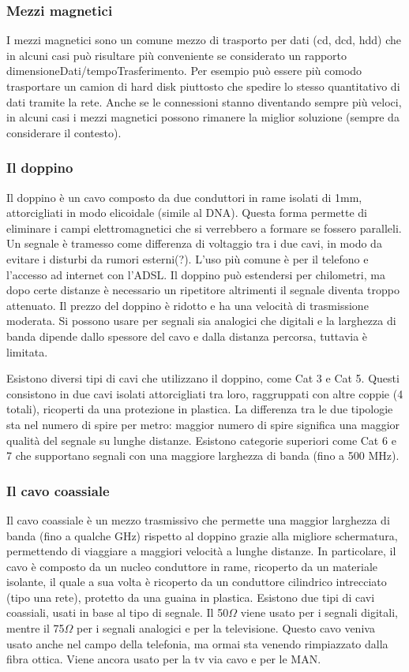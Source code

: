 \subsubsection{Mezzi magnetici}
I mezzi magnetici sono un comune mezzo di trasporto per dati (cd, dcd, hdd) che in alcuni casi può risultare più conveniente se considerato un rapporto dimensioneDati/tempoTrasferimento.
Per esempio può essere più comodo trasportare un camion di hard disk piuttosto che spedire lo stesso quantitativo di dati tramite la rete. 
Anche se le connessioni stanno diventando sempre più veloci, in alcuni casi i mezzi magnetici possono rimanere la miglior soluzione (sempre da considerare il contesto).

\subsubsection{Il doppino}
Il doppino è un cavo composto da due conduttori in rame isolati di 1mm, attorcigliati in modo elicoidale (simile al DNA).
Questa forma permette di eliminare i campi elettromagnetici che si verrebbero a formare se fossero paralleli.
Un segnale è tramesso come differenza di voltaggio tra i due cavi, in modo da evitare i disturbi da rumori esterni(?).
L'uso più comune è per il telefono e l'accesso ad internet con l'ADSL. 
Il doppino può estendersi per chilometri, ma dopo certe distanze è necessario un ripetitore altrimenti il segnale diventa troppo attenuato.
Il prezzo del doppino è ridotto e ha una velocità di trasmissione moderata.
Si possono usare per segnali sia analogici che digitali e la larghezza di banda dipende dallo spessore del cavo e dalla distanza percorsa, tuttavia è limitata.

Esistono diversi tipi di cavi che utilizzano il doppino, come Cat 3 e Cat 5.
Questi consistono in due cavi isolati attorcigliati tra loro, raggruppati con altre coppie (4 totali), ricoperti da una protezione in plastica.
La differenza tra le due tipologie sta nel numero di spire per metro: maggior numero di spire significa una maggior qualità del segnale su lunghe distanze.
Esistono categorie superiori come Cat 6 e 7 che supportano segnali con una maggiore larghezza di banda (fino a 500 MHz).

\subsubsection{Il cavo coassiale}
Il cavo coassiale è un mezzo trasmissivo che permette una maggior larghezza di banda (fino a qualche GHz) rispetto al doppino grazie alla migliore schermatura,
permettendo di viaggiare a maggiori velocità a lunghe distanze.
In particolare, il cavo è composto da un nucleo conduttore in rame, ricoperto da un materiale isolante,
il quale a sua volta è ricoperto da un conduttore cilindrico intrecciato (tipo una rete), protetto da una guaina in plastica.
Esistono due tipi di cavi coassiali, usati in base al tipo di segnale.
Il 50$\Omega$ viene usato per i segnali digitali, mentre il 75$\Omega$ per i segnali analogici e per la televisione.
Questo cavo veniva usato anche nel campo della telefonia, ma ormai sta venendo rimpiazzato dalla fibra ottica. Viene ancora usato per la tv via cavo e per le MAN.

